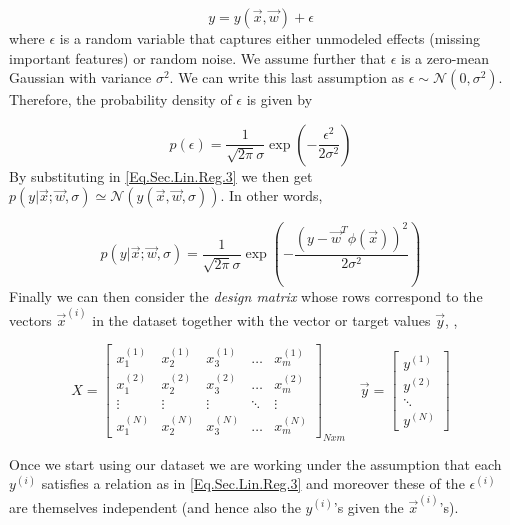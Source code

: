 \begin{equation}\label{Eq.Sec.Lin.Reg.3} 
y = y(\vec{x},\vec{w}) + \epsilon 
\end{equation}
where $\epsilon$ is a random variable that captures either unmodeled effects (\eg missing important features) or random noise. We assume further that $\epsilon$ is a zero-mean Gaussian with variance $\sigma^2$. We can write this last assumption as $\epsilon \sim \mathcal{N}(0,\sigma^2)$. Therefore, the probability density of $\epsilon$ is given by 

\[ p(\epsilon) = \frac{1}{\sqrt{2\pi}\sigma}\exp\left( - \frac{\epsilon^2}{2\sigma^2}\right)\]
By substituting in \ref{Eq.Sec.Lin.Reg.3} we then get $p(y| \vec{x}; \vec{w}, \sigma) \simeq \mathcal{N}(y(\vec{x},\vec{w}, \sigma))$. In other words,  

\begin{equation}
	p(y| \vec{x}; \vec{w}, \sigma) = \frac{1}{\sqrt{2\pi}\sigma}\exp\left( - \frac{(y-\vec{w}^T\phi(\vec{x}))^2}{2\sigma^2}\right)
\end{equation}
Finally we can then consider the \emph{design matrix} whose rows correspond to the vectors $\vec{x}^{(i)}$ in the dataset together with the vector or target values $\vec{y}$, \ie, 

\[ X = \begin{bmatrix}
	x_{1}^{(1)} & x_{2}^{(1)} & x_{3}^{(1)} & \dots  & x_{m}^{(1)} \\
	x_{1}^{(2)} & x_{2}^{(2)} & x_{3}^{(2)} & \dots  & x_{m}^{(2)} \\
	\vdots & \vdots & \vdots & \ddots & \vdots \\
	x_{1}^{(N)} & x_{2}^{(N)} & x_{3}^{(N)} & \dots  & x_{m}^{(N)}
\end{bmatrix}_{Nxm} \quad \vec{y} = \begin{bmatrix}
y^{(1)} \\
y^{(2)} \\ 
\ddots \\
y^{(N)}
\end{bmatrix}\]


\begin{remark}
	Once we start using our dataset we are working under the assumption that each $y^{(i)}$ satisfies a relation as in \ref{Eq.Sec.Lin.Reg.3} and moreover these of the $\epsilon^{(i)}$ are themselves independent (and hence also the $y^{(i)}$'s given the $\vec{x}^{(i)}$'s).
\end{remark}

